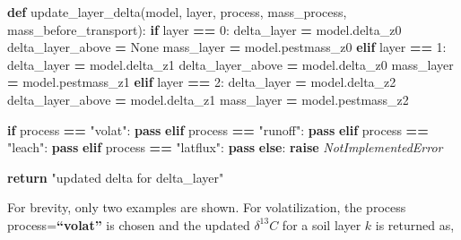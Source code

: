 \documentclass[]{article}
\newenvironment{Shaded}{\begin{snugshade}}{\end{snugshade}}
\newcommand{\KeywordTok}[1]{\textcolor[rgb]{0.13,0.29,0.53}{\textbf{#1}}}
\newcommand{\DecValTok}[1]{\textcolor[rgb]{0.00,0.00,0.81}{#1}}
\newcommand{\StringTok}[1]{\textcolor[rgb]{0.31,0.60,0.02}{#1}}
\newcommand{\VariableTok}[1]{\textcolor[rgb]{0.00,0.00,0.00}{#1}}
\newcommand{\ControlFlowTok}[1]{\textcolor[rgb]{0.13,0.29,0.53}{\textbf{#1}}}
\newcommand{\OperatorTok}[1]{\textcolor[rgb]{0.81,0.36,0.00}{\textbf{#1}}}
\newcommand{\PreprocessorTok}[1]{\textcolor[rgb]{0.56,0.35,0.01}{\textit{#1}}}
\newcommand{\NormalTok}[1]{#1}
\begin{document}
\begin{Shaded}
\begin{Highlighting}[]
\KeywordTok{def}\NormalTok{ update_layer_delta(model, layer, process, mass_process, mass_before_transport):}
    \ControlFlowTok{if}\NormalTok{ layer }\OperatorTok{==} \DecValTok{0}\NormalTok{:}
\NormalTok{      delta_layer }\OperatorTok{=}\NormalTok{ model.delta_z0}
\NormalTok{      delta_layer_above }\OperatorTok{=} \VariableTok{None}
\NormalTok{      mass_layer }\OperatorTok{=}\NormalTok{ model.pestmass_z0}
    \ControlFlowTok{elif}\NormalTok{ layer }\OperatorTok{==} \DecValTok{1}\NormalTok{:}
\NormalTok{        delta_layer }\OperatorTok{=}\NormalTok{ model.delta_z1}
\NormalTok{        delta_layer_above }\OperatorTok{=}\NormalTok{ model.delta_z0}
\NormalTok{        mass_layer }\OperatorTok{=}\NormalTok{ model.pestmass_z1}
    \ControlFlowTok{elif}\NormalTok{ layer }\OperatorTok{==} \DecValTok{2}\NormalTok{:}
\NormalTok{        delta_layer }\OperatorTok{=}\NormalTok{ model.delta_z2}
\NormalTok{        delta_layer_above }\OperatorTok{=}\NormalTok{ model.delta_z1}
\NormalTok{        mass_layer }\OperatorTok{=}\NormalTok{ model.pestmass_z2}
        
    \ControlFlowTok{if}\NormalTok{ process }\OperatorTok{==} \StringTok{"volat"}\NormalTok{:}
        \ControlFlowTok{pass}
    \ControlFlowTok{elif}\NormalTok{ process }\OperatorTok{==} \StringTok{"runoff"}\NormalTok{:}
        \ControlFlowTok{pass}
    \ControlFlowTok{elif}\NormalTok{ process }\OperatorTok{==} \StringTok{"leach"}\NormalTok{:}
        \ControlFlowTok{pass}
    \ControlFlowTok{elif}\NormalTok{ process }\OperatorTok{==} \StringTok{"latflux"}\NormalTok{:}
        \ControlFlowTok{pass}
    \ControlFlowTok{else}\NormalTok{:}
        \ControlFlowTok{raise} \PreprocessorTok{NotImplementedError}
    
    \ControlFlowTok{return} \StringTok{"updated delta for delta_layer"}
                       
\end{Highlighting}
\end{Shaded}

For brevity, only two examples are shown. For volatilization, the
process process=\textbf{``volat''} is chosen and the updated
\(\delta ^{13}C\) for a soil layer \(k\) is returned as,
\end{document}
